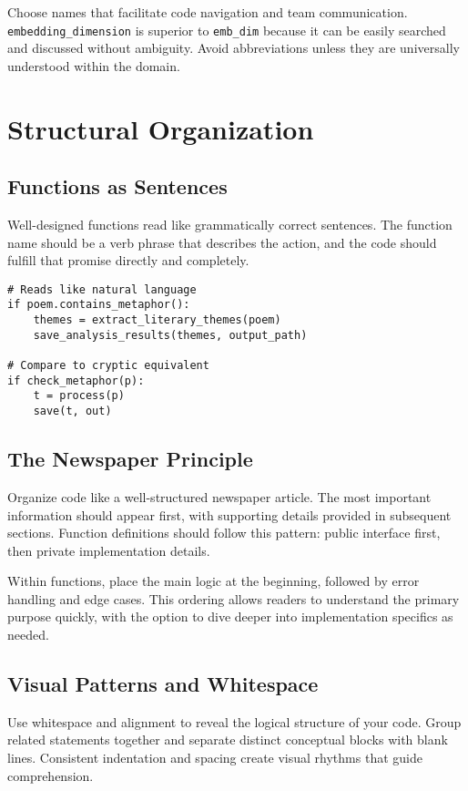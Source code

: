 \documentclass[11pt,a4paper]{article}
\begin{document}
Choose names that facilitate code navigation and team communication. \texttt{embedding\_dimension} is superior to \texttt{emb\_dim} because it can be easily searched and discussed without ambiguity. Avoid abbreviations unless they are universally understood within the domain.

\section{Structural Organization}

\subsection{Functions as Sentences}

Well-designed functions read like grammatically correct sentences. The function name should be a verb phrase that describes the action, and the code should fulfill that promise directly and completely.

\begin{lstlisting}[caption=Functions as readable sentences]
# Reads like natural language
if poem.contains_metaphor():
    themes = extract_literary_themes(poem)
    save_analysis_results(themes, output_path)

# Compare to cryptic equivalent
if check_metaphor(p):
    t = process(p)
    save(t, out)
\end{lstlisting}

\subsection{The Newspaper Principle}

Organize code like a well-structured newspaper article. The most important information should appear first, with supporting details provided in subsequent sections. Function definitions should follow this pattern: public interface first, then private implementation details.

Within functions, place the main logic at the beginning, followed by error handling and edge cases. This ordering allows readers to understand the primary purpose quickly, with the option to dive deeper into implementation specifics as needed.

\subsection{Visual Patterns and Whitespace}

Use whitespace and alignment to reveal the logical structure of your code. Group related statements together and separate distinct conceptual blocks with blank lines. Consistent indentation and spacing create visual rhythms that guide comprehension.
\end{document}
